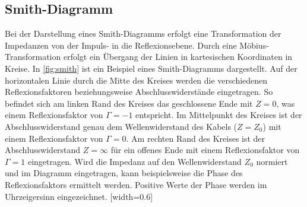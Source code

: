 \subsection{Smith-Diagramm}
Bei der Darstellung eines Smith-Diagramms erfolgt eine Transformation der Impedanzen von der Impuls- in die Reflexionsebene. Durch eine Möbius-Transformation erfolgt ein Übergang der Linien in kartesischen Koordinaten in Kreise. In \autoref{fig:smith} ist ein Beispiel eines Smith-Diagramms dargestellt. Auf der horizontalen Linie durch die Mitte des Kreises werden die verschiedenen Reflexionsfaktoren beziehungsweise Abschlusswiderstände eingetragen. So befindet sich am linken Rand des Kreises das geschlossene Ende mit $Z=0$, was einem Reflexionsfaktor von $\Gamma=-1$ entspricht. Im Mittelpunkt des Kreises ist der Abschlusswiderstand genau dem Wellenwiderstand des Kabels ($Z=Z_0$) mit einem Reflexionsfaktor von $\Gamma=0$. Am rechten Rand des Kreises ist der Abschlusswiderstand $Z=\infty$  für ein offenes Ende mit einem Reflexionsfaktor von $\Gamma=1$ eingetragen. Wird die Impedanz auf den Wellenwiderstand $Z_0$ normiert und im Diagramm eingetragen, kann beispielsweise die Phase des Reflexionsfaktors ermittelt werden. Positive Werte der Phase werden im Uhrzeigersinn eingezeichnet.
[width=0.6\textwidth]
